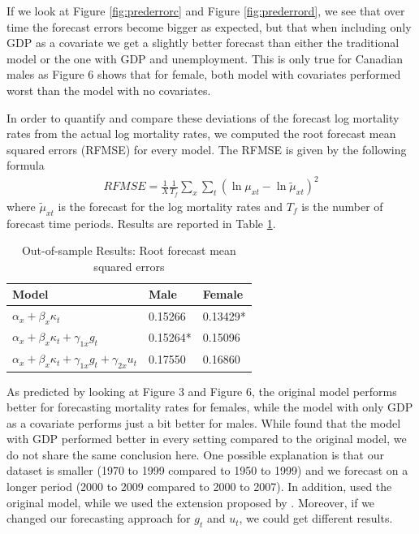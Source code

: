 \documentclass[AER, draftmode]{AEA}
\begin{document}
If we look at Figure \ref{fig:prederrorc} and Figure \ref{fig:prederrord}, we see that over time the forecast errors become bigger as expected, but that when including only GDP as a covariate we get a slightly better forecast than either the traditional model or the one with GDP and unemployment. This is only true for Canadian males as Figure 6 shows that for female, both model with covariates performed worst than the model with no covariates.

In order to quantify and compare these deviations of the forecast log mortality rates from the actual log mortality rates, we computed the root forecast mean squared errors (RFMSE) for every model. The RFMSE is given by the following formula
\begin{align}
RFMSE = \frac{1}{X}\frac{1}{T_f}\sum_x \sum_t (\ln\mu_{xt}-\ln\tilde{\mu}_{xt})^2
\end{align}
where $\tilde{\mu}_{xt}$ is the forecast for the log mortality rates and $T_f$ is the number of forecast time periods. Results are reported in Table \ref{teb:rmsfe}.

\begin{table}[!htp]
	\centering
	\caption{Out-of-sample Results: Root forecast mean squared errors}
	\label{teb:rmsfe}
	\begin{tabular}{lll}
		\hline
		Model                                                              & Male    & Female   \\ \hline
		$\alpha_x + \beta_x \kappa_t$                                      & 0.15266 & 0.13429* \\
		$\alpha_x + \beta_x \kappa_t + \gamma_{1x} g_t$                    & 0.15264* & 0.15096 \\
		$ \alpha_x + \beta_x \kappa_t + \gamma_{1x} g_t + \gamma_{2x} u_t$ & 0.17550 & 0.16860 \\ \hline
	\end{tabular}
\end{table}

As predicted by looking at Figure 3 and Figure 6,  the original model performs better for forecasting mortality rates for females, while the model with only GDP as a covariate performs just a bit better for males. While \cite{Niu2014} found that the model with GDP performed better in every setting compared to the original model, we do not share the same conclusion here. One possible explanation is that our dataset is smaller (1970 to 1999 compared to 1950 to 1999) and we forecast on a longer period (2000 to 2009 compared to 2000 to 2007). In addition, \cite{Niu2014} used the original \cite{Lee1992} model, while we used the extension proposed by \cite{Brouhns2002}. Moreover, if we changed our forecasting approach for $g_t$ and $u_t$, we could get different results. 
\end{document}
